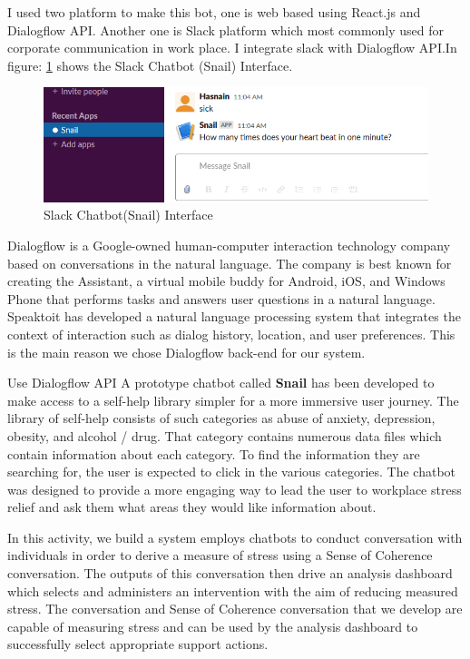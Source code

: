 I used two platform to make this bot, one is web based using React.\acs{js} and Dialogflow \acs{API}. Another one is Slack platform which most commonly used for corporate communication in work place. I integrate slack with Dialogflow \acs{API}.In figure: \ref{fig:Slackchat} shows the Slack Chatbot (Snail) Interface.

\begin{figure}[hbt!] 
  \centering
  \includegraphics[width=1.0\linewidth]{chap4/image4/slack_chat.png}
  \caption[Slack Chatbot(Snail) Interface ]{Slack Chatbot(Snail) Interface}
  \label{fig:Slackchat}
\end{figure}

Dialogflow is a Google-owned human-computer interaction technology company based on conversations in the natural language. The company is best known for creating the Assistant, a virtual mobile buddy for Android, iOS, and Windows Phone that performs tasks and answers user questions in a natural language.\citep{Zax2012TheSolved} Speaktoit has developed a natural language processing system that integrates the context of interaction such as dialog history, location, and user preferences. This is the main reason we chose Dialogflow back-end for our system.

Use Dialogflow API A prototype chatbot called \textbf{Snail} has been developed to make access to a self-help library simpler for a more immersive user journey. The library of self-help consists of such categories as abuse of anxiety, depression, obesity, and alcohol / drug. That category contains numerous data files which contain information about each category. To find the information they are searching for, the user is expected to click in the various categories. The chatbot was designed to provide a more engaging way to lead the user to workplace stress relief and ask them what areas they would like information about.

In this activity, we build a system employs chatbots to conduct conversation with individuals in order to derive a measure of stress using a Sense of Coherence conversation. The outputs of this conversation then drive an analysis dashboard which selects and administers an intervention with the aim of reducing measured stress. The conversation and Sense of Coherence conversation that we develop are capable of measuring stress and can be used by the analysis dashboard to successfully select appropriate support actions.

